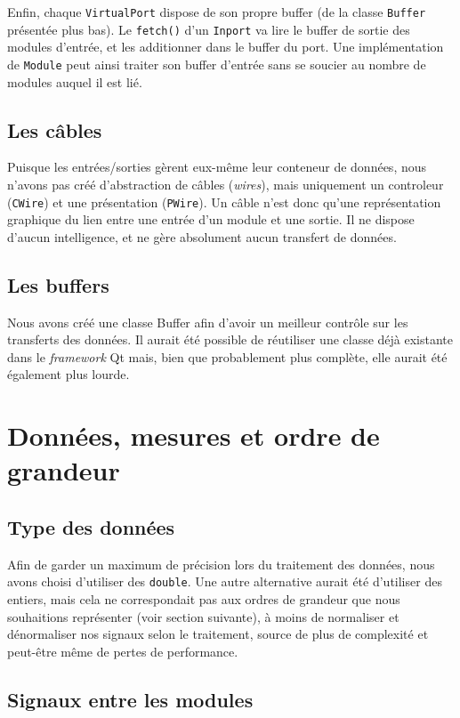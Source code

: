 Enfin, chaque \verb!VirtualPort! dispose de son propre buffer (de
la classe \verb!Buffer! présentée plus bas). Le \verb!fetch()! d'un
\verb!Inport! va lire le buffer de sortie des modules d'entrée, et
les additionner dans le buffer du port. Une implémentation de
\verb!Module! peut ainsi traiter son buffer d'entrée sans se
soucier au nombre de modules auquel il est lié.

\subsection{Les câbles}

Puisque les entrées/sorties gèrent eux-même leur conteneur de
données, nous n'avons pas créé d'abstraction de câbles
(\emph{wires}), mais uniquement un controleur (\verb!CWire!) et une
présentation (\verb!PWire!). Un câble n'est donc qu'une
représentation graphique du lien entre une entrée d'un module et
une sortie. Il ne dispose d'aucun intelligence, et ne gère
absolument aucun transfert de données.

\subsection{Les buffers}

Nous avons créé une classe Buffer afin d'avoir un meilleur contrôle
sur les transferts des données. Il aurait été possible de
réutiliser une classe déjà existante dans le \emph{framework} Qt
mais, bien que probablement plus complète, elle aurait été
également plus lourde.

\section{Données, mesures et ordre de grandeur}

\subsection{Type des données}

Afin de garder un maximum de précision lors du traitement des
données, nous avons choisi d'utiliser des \verb!double!. Une autre
alternative aurait été d'utiliser des entiers, mais cela ne
correspondait pas aux ordres de grandeur que nous souhaitions
représenter (voir section suivante), à moins de normaliser et
dénormaliser nos signaux selon le traitement, source de plus de
complexité et peut-être même de pertes de performance.

\subsection{Signaux entre les modules}

